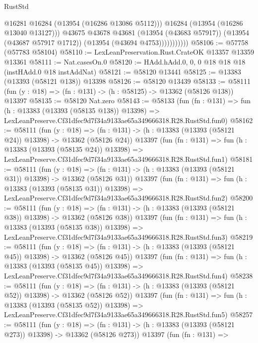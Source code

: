 \begin{lexlean}{RustStd}
\begin{coremodule}
                          @16281
                          @16284
                          (@13954 (@16286 @13086 @5112)))
                        @16284
                        (@13954 (@16286 @13040 @13127)))
                      @43675
                      @43678
                      @43681
                      (@13954 (@43683 @57917))
                      (@13954 (@43687 @57917 @1712))
                      (@13954 (@43694 @4753)))))))))))
@58106 := @57758 (@57783 @58104)
@58110 := LexLeanPreservation.Rust.CrateOK @13357 @13359 @13361
@58111 := Nat.casesOn.{0}
@58120 := HAdd.hAdd.{0, 0, 0} @18 @18 @18 (instHAdd.{0} @18 instAddNat)
@58121 := @58120 @13441
@58125 := @13383 (@13393 (@58121 @138)) @13398
@58126 := @58120 @13439
@58133 := @58111 (fun (y : @18) => (fn : @131) -> (h : @58125) -> @13362 (@58126 @138)) @13397
@58135 := @58120 Nat.zero
@58143 := @58133
    (fun (fn : @131) =>
    fun (h : @13383 (@13393 (@58135 @138)) @13398) =>
    LexLeanPreserve.Cf31dfec9d7f34a9133ae65a349666318.R28.RustStd.fun0)
@58162 := @58111
    (fun (y : @18) =>
    (fn : @131) -> (h : @13383 (@13393 (@58121 @24)) @13398) -> @13362 (@58126 @24))
    @13397
    (fun (fn : @131) =>
    fun (h : @13383 (@13393 (@58135 @24)) @13398) =>
    LexLeanPreserve.Cf31dfec9d7f34a9133ae65a349666318.R28.RustStd.fun1)
@58181 := @58111
    (fun (y : @18) =>
    (fn : @131) -> (h : @13383 (@13393 (@58121 @31)) @13398) -> @13362 (@58126 @31))
    @13397
    (fun (fn : @131) =>
    fun (h : @13383 (@13393 (@58135 @31)) @13398) =>
    LexLeanPreserve.Cf31dfec9d7f34a9133ae65a349666318.R28.RustStd.fun2)
@58200 := @58111
    (fun (y : @18) =>
    (fn : @131) -> (h : @13383 (@13393 (@58121 @38)) @13398) -> @13362 (@58126 @38))
    @13397
    (fun (fn : @131) =>
    fun (h : @13383 (@13393 (@58135 @38)) @13398) =>
    LexLeanPreserve.Cf31dfec9d7f34a9133ae65a349666318.R28.RustStd.fun3)
@58219 := @58111
    (fun (y : @18) =>
    (fn : @131) -> (h : @13383 (@13393 (@58121 @45)) @13398) -> @13362 (@58126 @45))
    @13397
    (fun (fn : @131) =>
    fun (h : @13383 (@13393 (@58135 @45)) @13398) =>
    LexLeanPreserve.Cf31dfec9d7f34a9133ae65a349666318.R28.RustStd.fun4)
@58238 := @58111
    (fun (y : @18) =>
    (fn : @131) -> (h : @13383 (@13393 (@58121 @52)) @13398) -> @13362 (@58126 @52))
    @13397
    (fun (fn : @131) =>
    fun (h : @13383 (@13393 (@58135 @52)) @13398) =>
    LexLeanPreserve.Cf31dfec9d7f34a9133ae65a349666318.R28.RustStd.fun5)
@58257 := @58111
    (fun (y : @18) =>
    (fn : @131) -> (h : @13383 (@13393 (@58121 @273)) @13398) -> @13362 (@58126 @273))
    @13397
    (fun (fn : @131) =>

\end{coremodule}
\end{lexlean}
